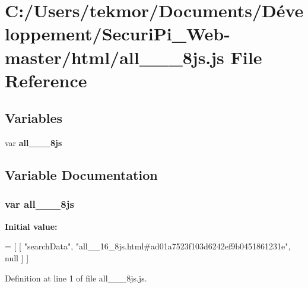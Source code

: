 \section{C\+:/\+Users/tekmor/\+Documents/\+Développement/\+Securi\+Pi\+\_\+\+Web-\/master/html/all\+\_\+\+\_\+\_\+8js.js File Reference}
\label{all____16__8js_8js}
\subsection*{Variables}
\begin{DoxyCompactItemize}
\item 
var {\bf all\+\_\+\+\_\+\_\+8js}
\end{DoxyCompactItemize}


\subsection{Variable Documentation}
\subsubsection[{all\+\_\+\+\_\+16\+\_\+8js}]{\setlength{\rightskip}{0pt plus 5cm}var all\+\_\+\+\_\+\_\+8js}\label{all____16__8js_8js_ac9e71a1369d081c66df4f669930fb55f}
{\bfseries Initial value\+:}
\begin{DoxyCode}
=
[
    [ \textcolor{stringliteral}{"searchData"}, \textcolor{stringliteral}{"all\_\_16\_8js.html#ad01a7523f103d6242ef9b0451861231e"}, null ]
]
\end{DoxyCode}


Definition at line 1 of file all\+\_\+\+\_\+\_\+8js.\+js.

